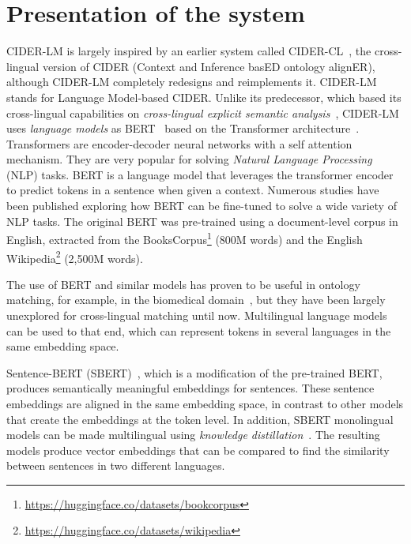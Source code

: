 \documentclass[
]{ceurart}
\begin{document}
\section{Presentation of the system}

CIDER-LM is largely inspired by an earlier system called CIDER-CL~\cite{Gracia2013cidercl}, the cross-lingual version of CIDER (Context and Inference basED ontology alignER), although CIDER-LM completely redesigns and reimplements it. CIDER-LM stands for Language Model-based CIDER. Unlike its predecessor, which based its cross-lingual capabilities on \textit{cross-lingual explicit semantic analysis}~\cite{Sorg2012}, CIDER-LM uses \textit{language models} as BERT~\cite{Devlin2019} based on the Transformer architecture~\cite{Vaswani2017}. Transformers are encoder-decoder neural networks with a self attention mechanism. They are very popular for solving \textit{Natural Language Processing} (NLP) tasks. 
BERT is a language model that leverages the transformer encoder to predict tokens in a sentence when given a context. Numerous studies have been published exploring how BERT can be fine-tuned to solve a wide variety of NLP tasks. The original BERT was pre-trained using a document-level corpus in English, extracted from the BooksCorpus\footnote{\url{https://huggingface.co/datasets/bookcorpus}} (800M words) and the English Wikipedia\footnote{\url{https://huggingface.co/datasets/wikipedia}} (2,500M words).


The use of BERT and similar models has proven to be useful in ontology matching, for example, in the biomedical domain~\cite{He2021}, but they have been largely unexplored for cross-lingual matching until now. Multilingual language models can be used to that end, which can represent tokens in several languages in the same embedding space.


Sentence-BERT (SBERT)~\cite{Reimers2019}, which is a modification of the pre-trained BERT, produces semantically meaningful embeddings for sentences. These sentence embeddings are aligned in the same embedding space, in contrast to other models that create the embeddings at the token level. In addition, SBERT monolingual models can be made multilingual using \textit{knowledge distillation}~\cite{reimers-2020-multilingual-sentence-bert}. The resulting models produce vector embeddings that can be compared to find the similarity between sentences in two different languages.
\end{document}
